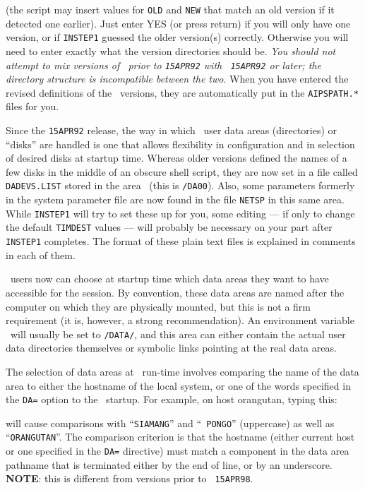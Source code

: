 \noindent (the script may insert values for {\tt OLD} and {\tt NEW} that
match an old version if it detected one earlier).  Just enter YES (or
press return) if you will only have one version, or if {\tt INSTEP1}
guessed the older version(s) correctly.  Otherwise you will need to enter
exactly what the version directories should be.  {\it You should not
attempt to mix versions of \AIPS\ prior to {\tt 15APR92} with {\tt
15APR92} or later; the directory structure is incompatible between the
two\/}.  When you have entered the revised definitions of the
\AIPS\ versions, they are automatically put in the {\tt AIPSPATH.*} files
for you.

\medskip{}

Since the {\tt 15APR92} release, the way in which \AIPS\ user data areas
(directories) or ``disks'' are handled is one that allows flexibility in
configuration and in selection of desired disks at startup time.  Whereas
older versions defined the names of a few disks in the middle of an
obscure shell script, they are now set in a file called {\tt DADEVS.LIST}
stored in the area \ (this is {\tt \AROOT/DA00}).  Also, some
parameters formerly in the system parameter file are now found in the file
{\tt NETSP} in this same area.  While {\tt INSTEP1} will try to set these
up for you, some editing --- if only to change the default {\tt TIMDEST}
values --- will probably be necessary on your part after {\tt INSTEP1}
completes.  The format of these plain text files is explained in comments
in each of them.

\AIPS\ users now can choose at startup time which data areas
they want to have accessible for the session.  By convention, these data
areas are named after the computer on which they are physically mounted,
but this is not a firm requirement (it is, however, a strong
recommendation).  An environment variable \DATAROOT\ will usually be set
to {\tt\AROOT/DATA/}, and this area can either contain the actual user
data directories themselves or symbolic links pointing at the real data
areas.

The selection of data areas at \ttaips\ run-time involves comparing the
name of the data area to either the hostname of the local system, or one
of the words specified in the {\tt DA=} option to the \ttaips\ startup.
For example, on host orangutan, typing this:\medskip

\medskip

\noindent will cause comparisons with ``{\tt SIAMANG}'' and ``{\tt
PONGO}'' (uppercase) as well as ``{\tt ORANG\-UTAN}''.  The comparison
criterion is that the hostname (either current host or one specified in
the {\tt DA=} directive) must match a component in the data area
pathname that is terminated either by the end of line, or by an
underscore.  {\bf NOTE}: this is different from versions prior to {\tt
15APR98}.

